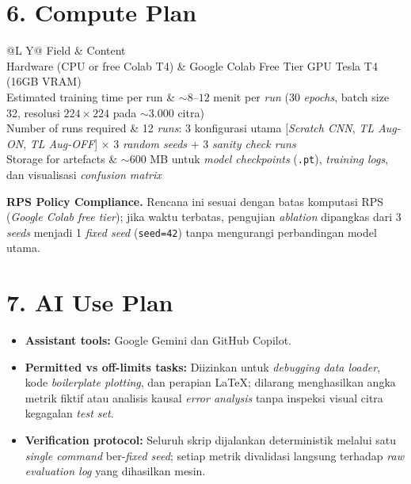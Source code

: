 \documentclass[9pt,a4paper]{extarticle}
\makeatletter
\renewcommand{\arraystretch}{1.12}
\newcommand{\proposalTable}[1]{%
    \renewcommand{\arraystretch}{1.14}%
    \begin{tabularx}{\textwidth}{@{}L Y@{}}
    \toprule[0.7pt]
    \textcolor{muted}{Field} & \textcolor{muted}{Content}\\
    \midrule
    #1
    \bottomrule[0.7pt]
    \end{tabularx}%
}
\makeatother
\begin{document}
\section*{6. Compute Plan}
\proposalTable{%
    Hardware (CPU or free Colab T4) & Google Colab Free Tier GPU Tesla T4 (16GB VRAM)\\
    Estimated training time per run & $\sim 8$--$12$ menit per \textit{run} (30 \textit{epochs}, batch size 32, resolusi $224\times224$ pada $\sim 3.000$ citra)\\
    Number of runs required & 12 \textit{runs}: 3 konfigurasi utama [\textit{Scratch CNN}, \textit{TL Aug-ON}, \textit{TL Aug-OFF}] $\times$ 3 \textit{random seeds} + 3 \textit{sanity check runs}\\
    Storage for artefacts & $\sim 600$ MB untuk \textit{model checkpoints} (\texttt{.pt}), \textit{training logs}, dan visualisasi \textit{confusion matrix}\\
}
\vspace{1pt}
\textbf{\color{ink}RPS Policy Compliance.} Rencana ini sesuai dengan batas komputasi RPS (\textit{Google Colab free tier}); jika waktu terbatas, pengujian \textit{ablation} dipangkas dari 3 \textit{seeds} menjadi 1 \textit{fixed seed} (\texttt{seed=42}) tanpa mengurangi perbandingan model utama.

\section*{7. AI Use Plan}
\begin{itemize}
    \item \textbf{Assistant tools:} Google Gemini dan GitHub Copilot.
    \item \textbf{Permitted vs off-limits tasks:} Diizinkan untuk \textit{debugging data loader}, kode \textit{boilerplate plotting}, dan perapian LaTeX; dilarang menghasilkan angka metrik fiktif atau analisis kausal \textit{error analysis} tanpa inspeksi visual citra kegagalan \textit{test set}.
    \item \textbf{Verification protocol:} Seluruh skrip dijalankan deterministik melalui satu \textit{single command} ber-\textit{fixed seed}; setiap metrik divalidasi langsung terhadap \textit{raw evaluation log} yang dihasilkan mesin.
\end{itemize}
\end{document}
